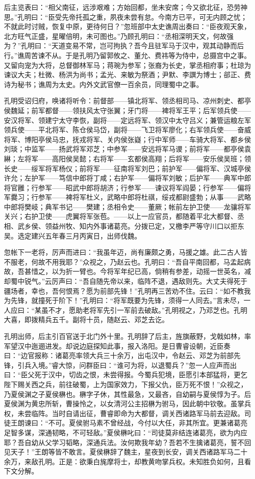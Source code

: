 后主览表曰：“相父南征，远涉艰难；方始回都，坐未安席；今又欲北征，恐劳神思。”孔明曰：“臣受先帝托孤之重，夙夜未尝有怠。今南方已平，可无内顾之忧；不就此时讨贼，恢复中原，更待何日？”忽班部中太史谯周出奏曰：“臣夜观天象，北方旺气正盛，星曜倍明，未可图也。”乃顾孔明曰：“丞相深明天文，何故强为？”孔明曰：“天道变易不常，岂可拘执？吾今且驻军马于汉中，观其动静而后行。”谯周苦谏不从。于是孔明乃留郭攸之、董允、费祎等为侍中，总摄宫中之事。又留向宠为大将，总督御林军马；蒋琬为参军；张裔为长史，掌丞相府事；杜琼为谏议大夫；杜微、杨洪为尚书；孟光、来敏为祭酒；尹默、李譔为博士；郤正、费诗为秘书；谯周为太史。内外文武官僚一百余员，同理蜀中之事。

孔明受诏归府，唤诸将听令：前督部——镇北将军、领丞相司马、凉州刺史、都亭侯魏延；前军都督——领扶风太守张翼；牙门将——裨将军王平；后军领兵使——安汉将军、领建宁太守李恢，副将——定远将军、领汉中太守吕义；兼管运粮左军领兵使——平北将军、陈仓侯马岱，副将——飞卫将军廖化；右军领兵使——奋威将军、博阳亭侯马忠，抚戎将军、关内侯张嶷；行中军师——车骑大将军、都乡侯刘琰；中监军——扬武将军邓芝；中参军——安远将军马谡；前将军——都亭侯袁綝；左将军——高阳侯吴懿；右将军——玄都侯高翔；后将军——安乐侯吴班；领长史——绥军将军杨仪；前将军——征南将军刘巴；前护军——偏将军、汉城亭侯许允；左护军——笃信中郎将丁咸；右护军——偏将军刘敏；后护军——典军中郎将官雝；行参军——昭武中郎将胡济；行参军——谏议将军阎晏；行参军——偏将军爨习；行参军——裨将军杜义，武略中郎将杜祺，绥戎都尉盛勃；从事——武略中郎将樊岐；典军书记——樊建；丞相令史——董厥；帐前左护卫使——龙骧将军关兴；右护卫使——虎翼将军张苞。——以上一应官员，都随着平北大都督、丞相、武乡侯、领益州牧、知内外事诸葛亮。分拨已定，又檄李严等守川口以拒东吴。选定建兴五年春三月丙寅日，出师伐魏。

忽帐下一老将，厉声而进曰：“我虽年迈，尚有廉颇之勇，马援之雄。此二古人皆不服老，何故不用我耶？”众视之，乃赵云也。孔明曰：“吾自平南回都，马孟起病故，吾甚惜之，以为折一臂也。今将军年纪已高，倘稍有参差，动摇一世英名，减却蜀中锐气。”云厉声曰：“吾自随先帝以来，临阵不退，遇敌则先。大丈夫得死于疆场者，幸也，吾何恨焉？愿为前部先锋！”孔明再三苦劝不住。云曰：“如不教我为先锋，就撞死于阶下！”孔明曰：“将军既要为先锋，须得一人同去。”言未尽，一人应曰：“某虽不才，愿助老将军先引一军前去破敌。”孔明视之，乃邓芝也。孔明大喜，即拨精兵五千。副将十员，随赵云、邓芝去讫。

孔明出师，后主引百官送于北门外十里。孔明辞了后主，旌旗蔽野，戈戟如林，率军望汉中迤逦进发。却说边庭探知此事，报入洛阳。是日曹睿设朝，近臣奏曰：“边官报称：诸葛亮率领大兵三十余万，出屯汉中，令赵云、邓芝为前部先锋，引兵入境。”睿大惊，问群臣曰：“谁可为将，以退蜀兵？”忽一人应声而出曰：“臣父死于汉中，切齿之恨，未尝得报。今蜀兵犯境，臣愿引本部猛将，更乞陛下赐关西之兵，前往破蜀，上为国家效力，下报父仇，臣万死不恨！”众视之，乃夏侯渊之子夏侯楙也。楙字子休，其性最急，又最吝，自幼嗣与夏侯惇为子。后夏侯渊为黄忠所斩，曹操怜之，以女清河公主招楙为驸马，因此朝中钦敬。虽掌兵权，未尝临阵。当时自请出征，曹睿即命为大都督，调关西诸路军马前去迎敌。司徒王朗谏曰：“不可。夏侯驸马素不曾经战，今付以大任，非其所宜。更兼诸葛亮足智多谋，深通韧略，不可轻敌。”夏侯楙叱曰：“司徒莫非结连诸葛亮，欲为内应耶？吾自幼从父学习韬略，深通兵法。汝何欺我年幼？吾若不生擒诸葛亮，誓不回见天子！”王朗等皆不敢言。夏侯楙辞了魏主，星夜到长安，调关西诸路军马二十余万，来敌孔明。正是：欲秉白旄摩将士，却教黄吻掌兵权。未知胜负如何，且看下文分解。